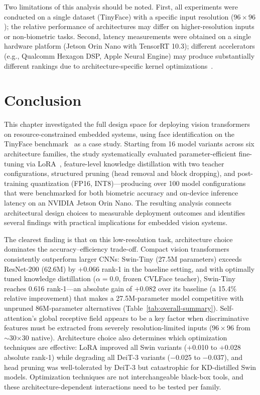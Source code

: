 \documentclass[runningheads,a4paper]{llncs}
\begin{document}
Two limitations of this analysis should be noted. First, all experiments were conducted on a single dataset (TinyFace) with a specific input resolution ($96\times96$); the relative performance of architectures may differ on higher-resolution inputs or non-biometric tasks. Second, latency measurements were obtained on a single hardware platform (Jetson Orin Nano with TensorRT 10.3); different accelerators (e.g., Qualcomm Hexagon DSP, Apple Neural Engine) may produce substantially different rankings due to architecture-specific kernel optimizations~\cite{Ngo2025EdgeInference}.

\section{Conclusion}

This chapter investigated the full design space for deploying vision transformers on resource-constrained embedded systems, using face identification on the TinyFace benchmark~\cite{cheng2018lowresface} as a case study. Starting from 16 model variants across six architecture families, the study systematically evaluated parameter-efficient fine-tuning via LoRA~\cite{hu2022lora}, feature-level knowledge distillation with two teacher configurations, structured pruning (head removal and block dropping), and post-training quantization (FP16, INT8)---producing over 100 model configurations that were benchmarked for both biometric accuracy and on-device inference latency on an NVIDIA Jetson Orin Nano. The resulting analysis connects architectural design choices to measurable deployment outcomes and identifies several findings with practical implications for embedded vision systems.

The clearest finding is that on this low-resolution task, architecture choice dominates the accuracy--efficiency trade-off. Compact vision transformers consistently outperform larger CNNs: Swin-Tiny (27.5M parameters) exceeds ResNet-200 (62.6M) by $+$0.066 rank-1 in the baseline setting, and with optimally tuned knowledge distillation ($\alpha = 0.0$, frozen CVLFace teacher), Swin-Tiny reaches 0.616 rank-1---an absolute gain of $+$0.082 over its baseline (a 15.4\% relative improvement) that makes a 27.5M-parameter model competitive with unpruned 86M-parameter alternatives (Table~\ref{tab:overall-summary}). Self-attention's global receptive field appears to be a key factor when discriminative features must be extracted from severely resolution-limited inputs ($96\times96$ from $\sim$30$\times$30 native). Architecture choice also determines which optimization techniques are effective: LoRA improved all Swin variants ($+$0.010 to $+$0.028 absolute rank-1) while degrading all DeiT-3 variants ($-$0.025 to $-$0.037), and head pruning was well-tolerated by DeiT-3 but catastrophic for KD-distilled Swin models. Optimization techniques are not interchangeable black-box tools, and these architecture-dependent interactions need to be tested per family.
\end{document}
